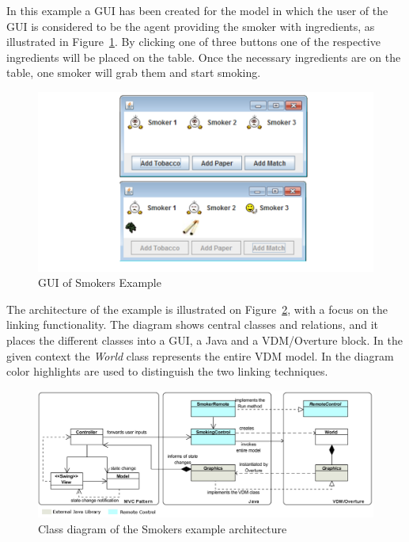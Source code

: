 \documentclass{overturerepchap}
\begin{document}
In this example a GUI has been created for the model in which the user of the GUI is considered to be the agent providing the smoker with ingredients, as illustrated in Figure~\ref{fig:gui:SmokersGUI}.  By clicking one of three buttons one of the respective ingredients will be placed on the table. Once the necessary ingredients are on the table, one smoker will grab them and start smoking. \\

\begin{figure}[!h]
\begin{center}
  \includegraphics[width=\textwidth]{figures/smokersGUI}
  \caption[labelInTOC]{GUI of Smokers Example}
  \label{fig:gui:SmokersGUI}
\end{center}
\end{figure}

The architecture of the example is illustrated on Figure~\ref{fig:gui:SmokersExampleCD}, with a focus on the  linking functionality. The diagram shows central classes and relations, and it places the different classes into a GUI, a Java and a VDM/Overture block. In the given context the \textit{World} class represents the entire VDM model. In the diagram color highlights are used to distinguish the two linking techniques. \\

\begin{figure}[!h]
\begin{center}
  \includegraphics[width=\textwidth]{figures/SmokersExampleCD}
  \caption[labelInTOC]{Class diagram of the Smokers example architecture}
  \label{fig:gui:SmokersExampleCD}
\end{center}
\end{figure}
\end{document}
